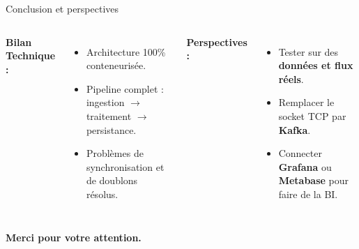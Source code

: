 \documentclass[aspectratio=169]{beamer}
\begin{document}
\begin{frame}{Conclusion et perspectives}
    \begin{columns}[t]
        \textbf{Bilan Technique :}
        \begin{itemize}
            \item[$\checkmark$] Architecture 100\% conteneurisée.
            \item[$\checkmark$] Pipeline complet : ingestion $\rightarrow$ traitement $\rightarrow$ persistance.
            \item[$\checkmark$] Problèmes de synchronisation et de doublons résolus.
        \end{itemize}

        \textbf{Perspectives :}
        \begin{itemize}
            \item Tester sur des \textbf{données et flux réels}.
            \item Remplacer le socket TCP par \textbf{Kafka}.
            \item Connecter \textbf{Grafana} ou \textbf{Metabase} pour faire de la BI.
        \end{itemize}
    \end{columns}
    
    \vspace{1cm}
    \begin{center}
        \Large \textbf{Merci pour votre attention.} \\
    \end{center}
\end{frame}
\end{document}
